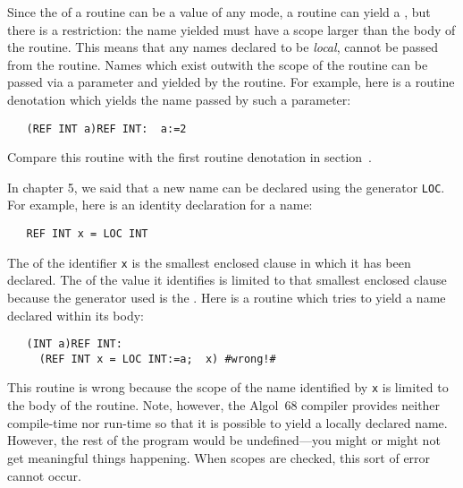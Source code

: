 Since the  of a routine can be a value of any mode, a
routine can yield a , but there is a restriction: the name
yielded must have a scope larger than the body of the routine.  This
means that any names declared to be \emph{local}, cannot be passed
from the routine. Names which exist outwith the scope of the routine
can be passed via a parameter and yielded by the routine. For
example, here is a routine denotation which yields the name
passed by such a parameter:
\begin{verbatim}
   (REF INT a)REF INT:  a:=2
\end{verbatim}
\noindent
Compare this routine with the first routine denotation in
section~.

In chapter 5, we said that a new name can be declared using the
generator \verb|LOC|. For example, here is an identity declaration
for a name:
\begin{verbatim}
   REF INT x = LOC INT
\end{verbatim}
\noindent
The  of the identifier \verb|x| is the smallest enclosed
clause in which it has been declared.  The  of the value it
identifies is limited to that smallest enclosed clause because the
generator used is the 
. Here is a routine which tries to yield a name declared
within its body:
\begin{verbatim}
   (INT a)REF INT:
     (REF INT x = LOC INT:=a;  x) #wrong!#
\end{verbatim}
\noindent
This routine is wrong because the scope of the name identified by
\verb|x| is limited to the body of the routine. Note, however, the
 Algol~68 compiler provides neither
compile-time nor run-time  so that it is possible
to yield a locally declared name. However, the rest of the program
would be undefined---you might or might not get meaningful things
happening.  When scopes are checked, this sort of error cannot occur.


